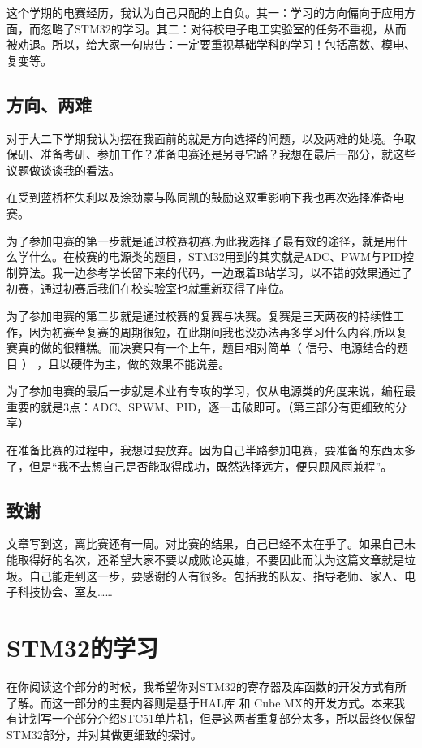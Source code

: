 \documentclass[cn,11pt]{elegantbook}
\begin{document}
这个学期的电赛经历，我认为自己只配的上自负。其一：学习的方向偏向于应用方面，而忽略了STM32的学习。其二：对待校电子电工实验室的任务不重视，从而被劝退。所以，给大家一句忠告：一定要重视基础学科的学习！包括高数、模电、复变等。

\section{方向、两难}

对于大二下学期我认为摆在我面前的就是方向选择的问题，以及两难的处境。争取保研、准备考研、参加工作？准备电赛还是另寻它路？我想在最后一部分，就这些议题做谈谈我的看法。

在受到蓝桥杯失利以及涂劲豪与陈同凯的鼓励这双重影响下我也再次选择准备电赛。

为了参加电赛的第一步就是通过校赛初赛.为此我选择了最有效的途径，就是用什么学什么。在校赛的电源类的题目，STM32用到的其实就是ADC、PWM与PID控制算法。我一边参考学长留下来的代码，一边跟着B站学习，以不错的效果通过了初赛，通过初赛后我们在校实验室也就重新获得了座位。

为了参加电赛的第二步就是通过校赛的复赛与决赛。复赛是三天两夜的持续性工作，因为初赛至复赛的周期很短，在此期间我也没办法再多学习什么内容,所以复赛真的做的很糟糕。而决赛只有一个上午，题目相对简单（ 信号、电源结合的题目 ） ，且以硬件为主，做的效果不能说差。

为了参加电赛的最后一步就是术业有专攻的学习，仅从电源类的角度来说，编程最重要的就是3点：ADC、SPWM、PID，逐一击破即可。（第三部分有更细致的分享）

在准备比赛的过程中，我想过要放弃。因为自己半路参加电赛，要准备的东西太多了，但是“我不去想自己是否能取得成功，既然选择远方，便只顾风雨兼程”。

\section{致谢}
文章写到这，离比赛还有一周。对比赛的结果，自己已经不太在乎了。如果自己未能取得好的名次，还希望大家不要以成败论英雄，不要因此而认为这篇文章就是垃圾。自己能走到这一步，要感谢的人有很多。包括我的队友、指导老师、家人、电子科技协会、室友……

\chapter{STM32的学习}

在你阅读这个部分的时候，我希望你对STM32的寄存器及库函数的开发方式有所了解。而这一部分的主要内容则是基于HAL库 和 Cube MX的开发方式。本来我有计划写一个部分介绍STC51单片机，但是这两者重复部分太多，所以最终仅保留STM32部分，并对其做更细致的探讨。
\end{document}
